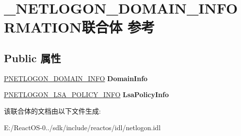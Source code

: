 \hypertarget{union___n_e_t_l_o_g_o_n___d_o_m_a_i_n___i_n_f_o_r_m_a_t_i_o_n}{}\section{\+\_\+\+N\+E\+T\+L\+O\+G\+O\+N\+\_\+\+D\+O\+M\+A\+I\+N\+\_\+\+I\+N\+F\+O\+R\+M\+A\+T\+I\+O\+N联合体 参考}
\label{union___n_e_t_l_o_g_o_n___d_o_m_a_i_n___i_n_f_o_r_m_a_t_i_o_n}
\subsection*{Public 属性}
\begin{DoxyCompactItemize}
\item 
\mbox{\label{union___n_e_t_l_o_g_o_n___d_o_m_a_i_n___i_n_f_o_r_m_a_t_i_o_n_ace473e1db7a2701add5a4742d9ac5e02}} 
\hyperlink{struct___n_e_t_l_o_g_o_n___d_o_m_a_i_n___i_n_f_o}{P\+N\+E\+T\+L\+O\+G\+O\+N\+\_\+\+D\+O\+M\+A\+I\+N\+\_\+\+I\+N\+FO} {\bfseries Domain\+Info}
\item 
\mbox{\label{union___n_e_t_l_o_g_o_n___d_o_m_a_i_n___i_n_f_o_r_m_a_t_i_o_n_a543089cd08144ab85ba0e4e4371ec554}} 
\hyperlink{struct___n_e_t_l_o_g_o_n___l_s_a___p_o_l_i_c_y___i_n_f_o}{P\+N\+E\+T\+L\+O\+G\+O\+N\+\_\+\+L\+S\+A\+\_\+\+P\+O\+L\+I\+C\+Y\+\_\+\+I\+N\+FO} {\bfseries Lsa\+Policy\+Info}
\end{DoxyCompactItemize}


该联合体的文档由以下文件生成\+:\begin{DoxyCompactItemize}
\item 
E\+:/\+React\+O\+S-\/0../sdk/include/reactos/idl/netlogon.\+idl\end{DoxyCompactItemize}
